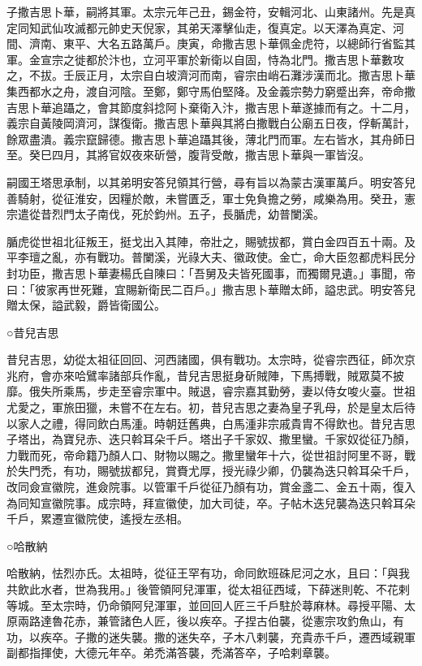 \begin{pinyinscope}
 子撒吉思卜華，嗣將其軍。太宗元年己丑，錫金符，安輯河北、山東諸州。先是真定同知武仙攻滅都元帥史天倪家，其弟天澤擊仙走，復真定。以天澤為真定、河間、濟南、東平、大名五路萬戶。庚寅，命撒吉思卜華佩金虎符，以總師行省監其軍。金宣宗之徙都於汴也，立河平軍於新衛以自固，恃為北門。撒吉思卜華數攻之，不拔。壬辰正月，太宗自白坡濟河而南，睿宗由峭石灘涉漢而北。撒吉思卜華集西都水之舟，渡自河陰。至鄭，鄭守馬伯堅降。及金義宗勢力窮蹙出奔，帝命撒吉思卜華追躡之，會其節度斜捻阿卜棄衛入汴，撒吉思卜華遂據而有之。十二月，義宗自黃陵岡濟河，謀復衛。撒吉思卜華與其將白撒戰白公廟五日夜，俘斬萬計，餘眾盡潰。義宗竄歸德。撒吉思卜華追躡其後，薄北門而軍。左右皆水，其舟師日至。癸巳四月，其將官奴夜來斫營，腹背受敵，撒吉思卜華與一軍皆沒。



 嗣國王塔思承制，以其弟明安答兒領其行營，尋有旨以為蒙古漢軍萬戶。明安答兒善騎射，從征淮安，因糧於敵，未嘗匱乏，軍士免負擔之勞，咸樂為用。癸丑，憲宗遣從昔烈門太子南伐，死於鈞州。五子，長腯虎，幼普闌溪。



 腯虎從世祖北征叛王，挺戈出入其陣，帝壯之，賜號拔都，賞白金四百五十兩。及平李璮之亂，亦有戰功。普闌溪，光祿大夫、徽政使。金亡，命大臣忽都虎料民分封功臣，撒吉思卜華妻楊氏自陳曰：「吾舅及夫皆死國事，而獨爾見遺。」事聞，帝曰：「彼家再世死難，宜賜新衛民二百戶。」撒吉思卜華贈太師，謚忠武。明安答兒贈太保，謚武毅，爵皆衛國公。



 ○昔兒吉思



 昔兒吉思，幼從太祖征回回、河西諸國，俱有戰功。太宗時，從睿宗西征，師次京兆府，會亦來哈鷿率諸部兵作亂，昔兒吉思挺身斫賊陣，下馬搏戰，賊眾莫不披靡。俄失所乘馬，步走至睿宗軍中。賊退，睿宗嘉其勤勞，妻以侍女唆火臺。世祖尤愛之，軍旅田獵，未嘗不在左右。初，昔兒吉思之妻為皇子乳母，於是皇太后待以家人之禮，得同飲白馬湩。時朝廷舊典，白馬湩非宗戚貴胄不得飲也。昔兒吉思子塔出，為寶兒赤、迭只斡耳朵千戶。塔出子千家奴、撒里蠻。千家奴從征乃顏，力戰而死，帝命籍乃顏人口、財物以賜之。撒里蠻年十六，從世祖討阿里不哥，戰於失門禿，有功，賜號拔都兒，賞賚尤厚，授光祿少卿，仍襲為迭只斡耳朵千戶，改同僉宣徽院，進僉院事。以管軍千戶從征乃顏有功，賞金盞二、金五十兩，復入為同知宣徽院事。成宗時，拜宣徽使，加大司徒，卒。子帖木迭兒襲為迭只斡耳朵千戶，累遷宣徽院使，遙授左丞相。



 ○哈散納



 哈散納，怯烈亦氏。太祖時，從征王罕有功，命同飲班硃尼河之水，且曰：「與我共飲此水者，世為我用。」後管領阿兒渾軍，從太祖征西域，下薛迷則乾、不花剌等城。至太宗時，仍命領阿兒渾軍，並回回人匠三千戶駐於蕁麻林。尋授平陽、太原兩路達魯花赤，兼管諸色人匠，後以疾卒。子捏古伯襲，從憲宗攻釣魚山，有功，以疾卒。子撒的迷失襲。撒的迷失卒，子木八剌襲，充貴赤千戶，遷西域親軍副都指揮使，大德元年卒。弟禿滿答襲，禿滿答卒，子哈剌章襲。



\end{pinyinscope}